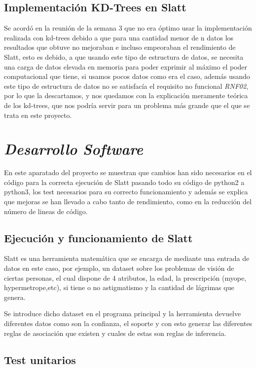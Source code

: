 \documentclass{cosas/tfg_domingo}
\begin{document}
\section{Implementación KD-Trees en Slatt}

Se acordó en la reunión de la semana 3 que no era óptimo usar la implementación realizada con kd-trees debido a que para una cantidad menor de n datos los resultados que obtuve no mejoraban e incluso empeoraban el rendimiento de Slatt, esto es debido, a que usando este tipo de estructura de datos, se necesita una carga de datos elevada en memoria para poder exprimir al máximo el poder computacional que tiene, si usamos pocos datos como era el caso, además usando este tipo de estructura de datos no se satisfacía el requisito no funcional \textit{RNF02}, por lo que la descartamos, y nos quedamos con la explicación meramente teórica de los kd-trees, que nos podría servir para un problema más grande que el que se trata en este proyecto.


\chapter{\emph{Desarrollo Software}}
En este aparatado del proyecto se muestran que cambios han sido necesarios en el código para la correcta ejecución de Slatt pasando todo su código de python2 a python3, los test necesarios para su correcto funcionamiento y además se explica que mejoras se han llevado a cabo tanto de rendimiento, como en la reducción del número de lineas de código.

\section{Ejecución y funcionamiento de Slatt}

Slatt es una herramienta matemática que se encarga de mediante una entrada de datos en este caso, por ejemplo, un dataset sobre los problemas de visión de ciertas personas, el cual dispone de 4 atributos, la edad, la prescripción (myope, hypermetrope,etc), si tiene o no astigmatismo y la cantidad de lágrimas que genera.

Se introduce dicho dataset en el programa principal y la herramienta devuelve diferentes datos como son la confianza, el soporte y con esto generar las diferentes reglas de asociación que existen y cuales de estas son reglas de inferencia. 

\section{Test unitarios}
\end{document}
